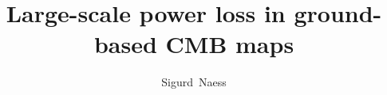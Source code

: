 \documentclass[twocolumn,apj]{aastex63}
\begin{document}
\title{Large-scale power loss in ground-based CMB maps}

\author[0000-0002-4478-7111]{Sigurd~Naess}
\end{document}
